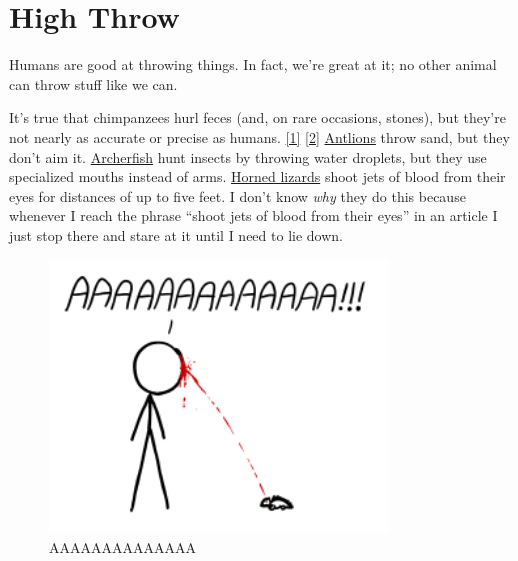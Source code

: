 {{
\chapter{High Throw}
}

\hfill{}

{Humans are good at throwing things. In fact, we’re great at it; no other animal can throw stuff like we can.}

{It's true that chimpanzees hurl feces (and, on rare occasions, stones), but they’re not nearly as accurate or precise as humans. \href{http://ecodevoevo.blogspot.com/2009/10/prehistory-of-throwing-things.html}{[1]} \href{http://www.academia.edu/235788/Chapter\_9.\_Stone\_tools\_and\_the\_evolution\_of\_hominin\_and\_human\_cognition}{[2]} \href{http://en.wikipedia.org/wiki/Antlion}{Antlions} throw sand, but they don’t aim it. \href{http://en.wikipedia.org/wiki/Archerfish}{Archerfish} hunt insects by throwing water droplets, but they use specialized mouths instead of arms. \href{http://en.wikipedia.org/wiki/Horned\_lizard}{Horned lizards} shoot jets of blood from their eyes for distances of up to five feet. I don’t know \emph{why} they do this because whenever I reach the phrase “shoot jets of blood from their eyes” in an article I just stop there and stare at it until I need to lie down.}

\begin{figure}[!htbp]
\centering
\includegraphics[scale=0.5, max width=0.8\textwidth]{imgs/a/44/high_throw_blood.png}
\caption{AAAAAAAAAAAAAA}
\end{figure}

}
